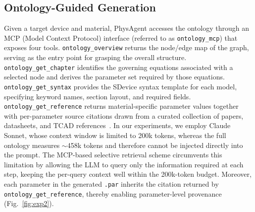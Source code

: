 \subsection{Ontology-Guided Generation}
Given a target device and material, PhysAgent accesses the ontology through an MCP (Model Context Protocol) interface {\color{red}(referred to as \texttt{ontology\_mcp})} that exposes four tools. \texttt{ontology\_overview} returns the node/edge map of the graph, serving as the entry point for grasping the overall structure. \texttt{ontology\_get\_chapter} identifies the governing equations associated with a selected node and derives the parameter set required by those equations. \texttt{ontology\_get\_syntax} provides the SDevice syntax template for each model, specifying keyword names, section layout, and required fields. \texttt{ontology\_get\_reference} returns material-specific parameter values together with per-parameter source citations drawn from a curated collection of papers, datasheets, and TCAD references{\color{red}~\cite{bludau1974, ioffe_nsm}}. In our experiments, we employ Claude Sonnet, whose context window is limited to 200k tokens, whereas the full ontology measures $\sim$458k tokens and therefore cannot be injected directly into the prompt. The MCP-based selective retrieval scheme circumvents this limitation by allowing the LLM to query only the information required at each step, keeping the per-query context well within the 200k-token budget. Moreover, each parameter in the generated \texttt{.par} inherits the citation returned by \texttt{ontology\_get\_reference}, thereby enabling parameter-level provenance (Fig.~\ref{fig:exp2}).

